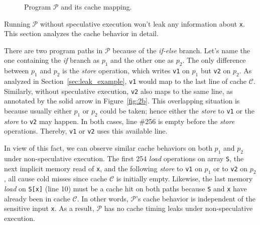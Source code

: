 \documentclass[sigconf,screen]{acmart}
\newcommand{\prog}{\mathcal{P}}
\begin{document}
\begin{figure}
{\begin{minipage}{0.3\linewidth}
\end{minipage}
}
\vspace{-3ex}
\caption{Program $\mathcal{P}$ and its cache mapping.}
\label{fig:motiv}
\vspace{-2ex}
\end{figure}




Running $\prog$ without speculative execution won't leak any information 
about \texttt{x}. This section analyzes the cache behavior in detail. 


There are two program paths in $\prog$ because of the \textit{if-else} 
branch. Let's name the one containing the \textit{if} branch as $p_1$ 
and the other one as $p_2$. The only difference between $p_1$ and $p_2$
is the \emph{store} operation, which writes \texttt{v1} on $p_1$ but 
\texttt{v2} on $p_2$. As analyzed in Section~\ref{sec:leak_example}, 
\texttt{v1} would map to the last line of cache $\mathcal{C}$. Similarly, 
without speculative execution, \texttt{v2} also maps to the same line, as 
annotated by the solid arrow in Figure~\ref{fig:2b}. This overlapping 
situation is because usually either $p_1$ or $p_2$ could be taken; 
hence either the \textit{store} to \texttt{v1} or the \textit{store} 
to \texttt{v2} may happen. In both cases, line \#256 is empty before 
the \textit{store} operations. Thereby, \texttt{v1} or \texttt{v2} 
uses this available line.


In view of this fact, we can observe similar cache behaviors on both $p_1$ 
and $p_2$ under non-speculative execution. The first 254 \emph{load} 
operations on array \texttt{S}, the next implicit memory read of \texttt{x},
and the following \textit{store} to \texttt{v1} on $p_1$ or to \texttt{v2} 
on $p_2$, all cause cold misses since cache $\mathcal{C}$ is initially empty. 
Likewise, the last memory \emph{load} on \texttt{S[x]} (line 10) must be a 
cache hit on both paths because \texttt{S} and \texttt{x} have already been 
in cache $\mathcal{C}$. In other words, $\prog$'s cache behavior is 
independent of the sensitive input \texttt{x}. As a result, $\prog$ has no 
cache timing leaks under non-speculative execution.
\end{document}
